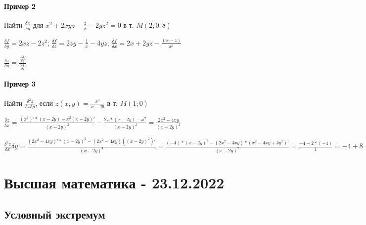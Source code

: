 \documentclass{article}
\begin{document}
\begin{flushleft}
\paragraph{Пример 2}

\hfill

\hfill

Найти $\frac{\delta x}{\delta y}$ для $x^2 + 2xyz - \frac{z}{x} - 2yz^2 = 0$ в т. $M(2; 0; 8)$

$\frac{\delta f}{\delta y} = 2xz - 2z^2$; $\frac{\delta f}{\delta z} = 2zy - \frac{1}{x} - 4yz$; $\frac{\delta f}{\delta x} = 2x + 2yz - \frac{(x - z)}{x^2}$

$\frac{\delta z}{\delta y} = \frac{\frac{- \delta f}{\delta y}}{\frac{\delta f}{\delta z}}$


\paragraph{Пример 3}

\hfill

\hfill

Найти $\frac{\delta^2 z}{\delta x \delta y}$, если $z(x, y) = \frac{x^2}{x - 26}$ в т. $M(1; 0)$

$\frac{\delta z}{\delta x} = \frac{(x^2)' * (x - 2y) - x^2(x - 2y)'}{(x - 2y)^2} - \frac{2x * (x - 2y) - x^2}{(x - 2y)^2} = \frac{2x^2 - 4x y}{(x - 2y)^2}$

$\frac{\delta^2 z}{\delta x}{\delta y} = \frac{(2x^2 - 4xy)' * (x - 2y)^2 - (2x^2 - 4xy)((x - 2y)^2)'}{(x - 2y)^4} = \frac{(-4) * (x - 2y)^2 - (2x^2 - 4xy) * (x^2 - 4x y + 4y^2)'}{(x - 2y)^2} = \frac{-4 - 2 * (-4)}{1} = -4 + 8 = 4$

\end{flushleft}

\pagebreak
\section{Высшая математика - 23.12.2022}

\subsection{Условный экстремум}
\end{document}
